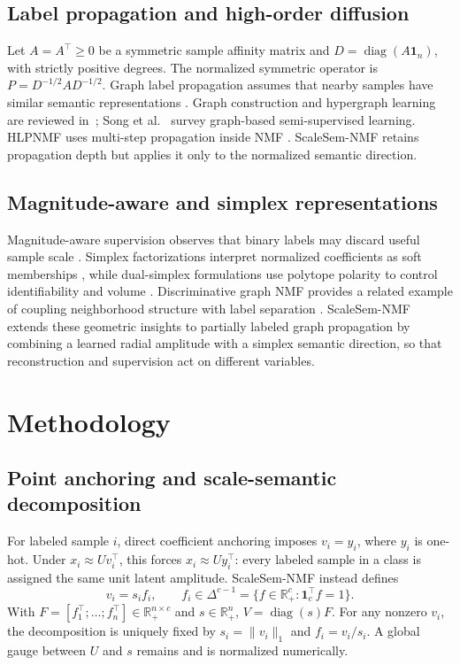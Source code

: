 \documentclass[a4paper,preprint,12pt]{elsarticle}
\theoremstyle{remark}
\begin{document}
\subsection{Label propagation and high-order diffusion}

Let \(A=A^\top\ge0\) be a symmetric sample affinity matrix and \(D=\operatorname{diag}(A\mathbf 1_n)\), with strictly positive degrees. The normalized symmetric operator is
$
P=D^{-1/2}AD^{-1/2}.
$
Graph label propagation assumes that nearby samples have similar semantic representations \cite{Zhu2003GaussianFields,Zhou2004LGC}. Graph construction and hypergraph learning are reviewed in~\cite{Qiao2018GraphReview,Gao2022HypergraphReview}; Song et al.~\cite{Song2023GSSLReview} survey graph-based semi-supervised learning. HLPNMF uses multi-step propagation inside NMF \cite{Li2026HLPNMF}. ScaleSem-NMF retains propagation depth but applies it only to the normalized semantic direction.

\subsection{Magnitude-aware and simplex representations}

Magnitude-aware supervision observes that binary labels may discard useful sample scale \cite{Jing2025SNMFSP}. Simplex factorizations interpret normalized coefficients as soft memberships \cite{Abdolali2021SSMF}, while dual-simplex formulations use polytope polarity to control identifiability and volume \cite{Abdolali2024DualSimplex}. Discriminative graph NMF provides a related example of coupling neighborhood structure with label separation \cite{Xing2021GNMFLD}. ScaleSem-NMF extends these geometric insights to partially labeled graph propagation by combining a learned radial amplitude with a simplex semantic direction, so that reconstruction and supervision act on different variables.

\section{Methodology}

\subsection{Point anchoring and scale-semantic decomposition}

For labeled sample \(i\), direct coefficient anchoring imposes \(v_i=y_i\), where \(y_i\) is one-hot. Under \(x_i\approx Uv_i^\top\), this forces \(x_i\approx Uy_i^\top\): every labeled sample in a class is assigned the same unit latent amplitude. ScaleSem-NMF instead defines
\[
v_i=s_i f_i,\qquad f_i\in\Delta^{c-1}
=\{f\in\mathbb R_+^c:\mathbf 1_c^\top f=1\}.
\]
With \(F=[f_1^\top;\ldots;f_n^\top]\in\mathbb R_+^{n\times c}\) and \(s\in\mathbb R_+^n\),
$
V=\operatorname{diag}(s)F.
$
For any nonzero \(v_i\), the decomposition is uniquely fixed by \(s_i=\lVert v_i\rVert_1\) and \(f_i=v_i/s_i\). A global gauge between \(U\) and \(s\) remains and is normalized numerically.
\end{document}
